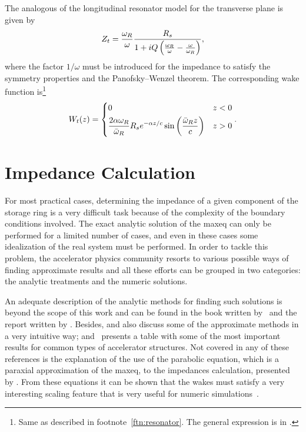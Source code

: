     The analogous of the longitudinal resonator model for the transverse plane is given by
    \begin{align}\label{eq:trans_resonator_impedance}
        Z_t =  \frac{\omega_R}{\omega}\frac{R_s}{1 + iQ\left(\frac{\omega_R}{\omega}-\frac{\omega}{\omega_R}\right)},
    \end{align}
    where the factor $1/\omega$ must be introduced for the impedance to satisfy the symmetry properties and the Panofsky--Wenzel theorem. The corresponding wake function is\footnote{Same as described in footnote~\ref{ftn:resonator}. The general expression is in .}
    \begin{align}
        W_t(z) =
        \begin{dcases}
            0 & z < 0 \\
            \frac{2\alpha\omega_R}{\bar{\omega}_R}R_se^{-\alpha z/c}
                                        \sin\left(\frac{\bar{\omega}_Rz}{c}\right) & z>0
        \end{dcases}.
    \end{align}

\section{Impedance Calculation}

    For most practical cases, determining the impedance of a given component of the storage ring is a very difficult task because of the complexity of the boundary conditions involved. The exact analytic solution of the \gls{maxeq} can only be performed for a limited number of cases, and even in these cases some idealization of the real system must be performed. In order to tackle this problem, the accelerator physics community resorts to various possible ways of finding approximate results and all these efforts can be grouped in two categories: the analytic treatments and the numeric solutions.

	An adequate description of the analytic methods for finding such solutions is beyond the scope of this work and can be found in the book written by~ and the report written by . Besides,  and  also discuss some of the approximate methods in a very intuitive way; and~ presents a table with some of the most important results for common types of accelerator structures. Not covered in any of these references is the explanation of the use of the parabolic equation, which is a paraxial approximation of the \gls{maxeq}, to the impedances calculation, presented by . From these equations it can be shown that the wakes must satisfy a very interesting scaling feature that is very useful for numeric simulations~\cite{stupakov2011}.

